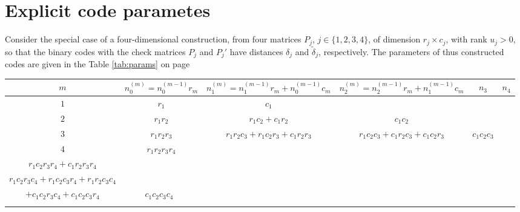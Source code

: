 \documentclass[aps,prb,12pt,tightenlines,%
notitlepage,longbibliography]{revtex4-1}
\begin{document}
\section{Explicit code parametes}

Consider the special case of a four-dimensional construction, from
four matrices $P_j$, $j\in\{1,2,3,4\}$, of dimension $r_j\times c_j$,
with rank $u_j>0$, so that the binary codes with the check matrices
$P_j$ and $P_j'$ have distances $\delta_j$ and $\tilde{\delta}_j$,
respectively.  The parameters of thus constructed codes are given in
the Table \ref{tab:params} on page \pageref{tab:params}

\begin{turnpage}
\begin{table}[htbp]
  \centering\small
  \begin{tabular}[c]{c||c|c|c|c|c}
    $m$ 
    & $n_0^{(m)}=n_0^{(m-1)}r_m$ & $n_1^{(m)}=n_1^{(m-1)}r_m+n_0^{(m-1)}c_m$ & $n_2^{(m)}=n_2^{(m-1)}r_m+n_1^{(m-1)}c_m$ & $n_3$ & $n_4$ \\ \hline
    $1$  & $r_1$ & $c_1$ &  & & \\ \hline 
    $2$  & $r_1r_2$ & $r_1c_2+c_1r_2$ & $c_1c_2$ & & \\ \hline 
    $3$ & $r_1r_2r_3$ & $r_1r_2c_3+r_1c_2r_3+c_1r_2r_3$ 
                    & $r_1c_2c_3+c_1r_2c_3+c_1c_2r_3$ 
                            & $c_1c_2c_3$ & \\ \hline 
    $4$ & $r_1r_2r_3r_4 $ &
                            \begin{minipage}[c]{1.2in}
                              $r_1r_2r_3c_4+r_1r_2c_3r_4$ \\
                              $r_1c_2r_3r_4+c_1r_2r_3r_4$ 
                            \end{minipage} 
    & \begin{minipage}[c]{1.9in}
      $c_1r_2r_3c_4+c_1r_2c_3r_4+c_1c_2r_3r_4$ \\
      $r_1c_2r_3c_4+r_1c_2c_3r_4+r_1r_2c_3c_4$ 
    \end{minipage} 
    &                        \begin{minipage}[c]{1.3in}
                              \strut\hfill$r_1c_2c_3c_4+c_1r_2c_3c_4$ \\
                              $+c_1c_2r_3c_4+c_1c_2c_3r_4$\strut
                            \end{minipage}
    & $c_1c_2c_3c_4$ ${}_{\strut}$ \\ \hline\hline

\end{tabular}
\end{table}
\end{turnpage}
\end{document}
